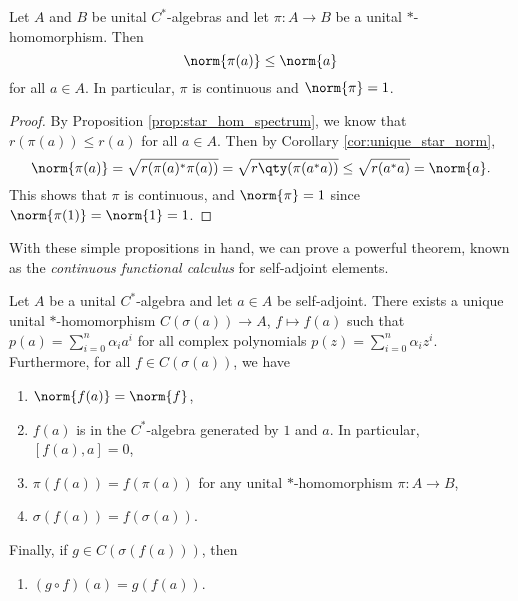 \begin{proposition}\label{prop:star_hom_cont}
Let $A$ and $B$ be unital $C^*$-algebras and let $\pi:A \rightarrow B$ be a unital $*$-homomorphism. Then
\begin{equation}
\norm{\pi(a)} \leq \norm{a}
\end{equation}
for all $a \in A$. In particular, $\pi$ is continuous and $\norm{\pi} = 1$.
\end{proposition}


\begin{proof}
By Proposition \ref{prop:star_hom_spectrum}, we know that $r(\pi(a)) \leq r(a)$ for all $a \in A$. Then by Corollary \ref{cor:unique_star_norm},
\begin{equation}
\norm{\pi(a)} = \sqrt{r(\pi(a)^*\pi(a))} = \sqrt{r\qty(\pi(a^*a))} \leq \sqrt{r(a^*a)} = \norm{a}.
\end{equation}
This shows that $\pi$ is continuous, and $\norm{\pi} = 1$ since $\norm{\pi(1)} = \norm{1} = 1$.
\end{proof}



With these simple propositions in hand, we can prove a powerful theorem, known as the \emph{continuous functional calculus} for self-adjoint elements.

\begin{theorem}
Let $A$ be a unital $C^*$-algebra and let $a \in A$ be self-adjoint. There exists a unique unital $*$-homomorphism $C(\sigma(a)) \rightarrow A$, $f \mapsto f(a)$ such that $p(a) = \sum_{i=0}^n \alpha_{i} a^i$ for all complex polynomials $p(z) = \sum_{i=0}^n \alpha_i z^i $. Furthermore, for all $f \in C(\sigma(a))$, we have
	\begin{enumerate}
		\item[\tn{(i)}] $\norm{f(a)} = \norm{f}$,
		\item[\tn{(ii)}] $f(a)$ is in the $C^*$-algebra generated by $1$ and $a$. In particular, $[f(a),a] = 0$, 
		\item[\tn{(iii)}] $\pi(f(a)) = f(\pi(a))$ for any unital $*$-homomorphism $\pi:A \rightarrow B$,
		\item[\tn{(iv)}] $\sigma(f(a)) = f(\sigma(a))$.
	\end{enumerate}
Finally, if $g \in C(\sigma(f(a)))$, then
	\begin{enumerate}
		\item[\tn{(v)}] $(g \circ f)(a) = g(f(a))$.
	\end{enumerate}	
\end{theorem}

